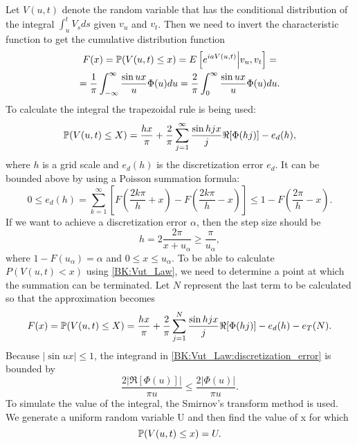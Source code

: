             Let $V(u,t)$  denote the random
            variable that has the conditional distribution of the integral $\int_{u}^t V_s ds$ given $v_u$ and $v_t$.    
            Then we need to invert the characteristic function to get the cumulative distribution function
            \begin{multline}
                F(x) = \P(V(u, t) \leq x) = E\left[ e^{iaV(u,t)} \Big| v_u, v_t\right] =\\= \frac{1}{\pi} \int_{-\infty}^\infty \frac{\sin ux}{u} \Phi(u) du 
                = \frac{2}{\pi} \int_{0}^\infty \frac{\sin ux}{u} \Phi(u) du.
            \end{multline}
            To calculate the integral the trapezoidal rule is being used:
            \begin{equation}\label{BK:Vut_Law}
                \P(V(u, t) \leq X) = \frac{hx}{\pi} + \frac{2}{\pi} \sum_{j=1}^\infty \frac{\sin hjx}{j} \Re[\Phi(hj)] - e_d(h),
            \end{equation}
            where $h$ is a grid scale and $e_d(h)$ is the discretization error $e_d$.
            It can be bounded above by using a Poisson summation formula:
            \begin{equation}\label{BK:Vut_Law:discretization_error}
                0 \leq e_d(h) = \sum_{k=1}^\infty\left[ F\left(\frac{2k\pi}{h} + x\right) - F\left(\frac{2k\pi}{h} - x\right)\right] \leq 1 - F\left(\frac{2\pi}{h} - x\right).
            \end{equation}
            If we want to achieve a discretization error $\alpha$, then the
            step size should be
            \begin{equation}
                h = 2\frac{2\pi}{x+ u_\alpha} \geq \frac{\pi}{u_\alpha},
            \end{equation}
            where $1-F(u_\alpha) = \alpha$ and $0 \leq x \leq u_\alpha$.
            To be able to calculate $P(V(u, t) < x )$ using \eqref{BK:Vut_Law}, we
            need to determine a point at which the summation can be
            terminated. Let $N$ represent the last term to be calculated
            so that the approximation becomes
            \begin{equation}
                F(x) = \P(V(u, t) \leq X) = \frac{hx}{\pi} + \frac{2}{\pi} \sum_{j=1}^N \frac{\sin hjx}{j} \Re[\Phi(hj)] - e_d(h) - e_T(N).
            \end{equation}
            Because $|\sin ux| \leq 1$, the integrand in \eqref{BK:Vut_Law:discretization_error} is bounded by
            \begin{equation}
                \frac{2|\Re[\Phi(u)]|}{\pi u} \leq \frac{2|\Phi(u)|}{\pi u}.
            \end{equation}
            To simulate the value of the integral, the Smirnov's transform method is used. We generate a uniform random variable U and then find the value of x for which 
            \begin{equation}
                \P(V(u, t) \leq x) = U.
            \end{equation}

